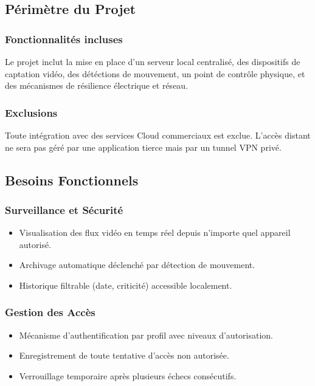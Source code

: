 \documentclass[12pt,a4paper]{article}
\begin{document}
\subsection{Périmètre du Projet}

\subsubsection{Fonctionnalités incluses}
Le projet inclut la mise en place d'un serveur local centralisé, des dispositifs de captation vidéo, des détéctions de mouvement, un point de contrôle physique, et des mécanismes de résilience électrique et réseau.

\subsubsection{Exclusions}
Toute intégration avec des services Cloud commerciaux est exclue. L'accès distant ne sera pas géré par une application tierce mais par un tunnel VPN privé.

\subsection{Besoins Fonctionnels}

\subsubsection{Surveillance et Sécurité}
\begin{itemize}[label=•]
    \item Visualisation des flux vidéo en temps réel depuis n'importe quel appareil autorisé.
    \item Archivage automatique déclenché par détection de mouvement.
    \item Historique filtrable (date, criticité) accessible localement.
\end{itemize}

\subsubsection{Gestion des Accès}
\begin{itemize}[label=•]
    \item Mécanisme d'authentification par profil avec niveaux d'autorisation.
    \item Enregistrement de toute tentative d'accès non autorisée.
    \item Verrouillage temporaire après plusieurs échecs consécutifs.
\end{itemize}
\end{document}
